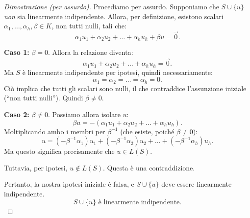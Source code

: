 
\begin{proof}[Dimostrazione (per assurdo)]
    Procediamo per assurdo.  
    Supponiamo che \(S \cup \{u\}\) \emph{non} sia linearmente indipendente.  
    Allora, per definizione, esistono scalari 
    \(\alpha_1, \dots, \alpha_h, \beta \in K\), non tutti nulli, tali che:
    \[
        \alpha_1 u_1 + \alpha_2 u_2 + \dots + \alpha_h u_h + \beta u = \vec{0}.
    \]

    \textbf{Caso 1:} \(\beta = 0\).  
    Allora la relazione diventa:
    \[
        \alpha_1 u_1 + \alpha_2 u_2 + \dots + \alpha_h u_h = \vec{0}.
    \]
    Ma \(S\) è linearmente indipendente per ipotesi, quindi necessariamente:
    \[
        \alpha_1 = \alpha_2 = \dots = \alpha_h = 0.
    \]
    Ciò implica che tutti gli scalari sono nulli, il che contraddice l’assunzione iniziale
    (“non tutti nulli”).  
    Quindi \(\beta \neq 0\).

    \medskip
    \textbf{Caso 2:} \(\beta \neq 0\).  
    Possiamo allora isolare \(u\):
    \[
        \beta u = -(\alpha_1 u_1 + \alpha_2 u_2 + \dots + \alpha_h u_h).
    \]
    Moltiplicando ambo i membri per \(\beta^{-1}\) (che esiste, poiché \(\beta \neq 0\)):
    \[
        u = (-\beta^{-1}\alpha_1) u_1 + (-\beta^{-1}\alpha_2) u_2 + \dots + (-\beta^{-1}\alpha_h) u_h.
    \]
    Ma questo significa precisamente che \(u \in L(S)\).

    Tuttavia, per ipotesi, \(u \notin L(S)\).  
    Questa è una contraddizione.

    \medskip
    Pertanto, la nostra ipotesi iniziale è falsa, e \(S \cup \{u\}\) deve essere linearmente indipendente.
    \[
        \boxed{S \cup \{u\} \text{ è linearmente indipendente.}}
    \]
\end{proof}



